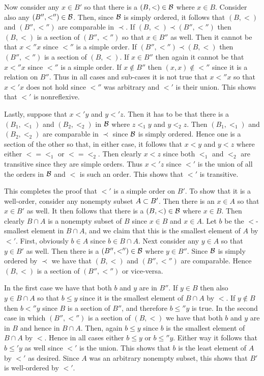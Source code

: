 {{    Now consider any $x \in B'$ so that there is a $(B,<) \in \cB$ where $x \in B$.
    Consider also any $(B'', <'') \in \cB$.
    Then, since $\cB$ is simply ordered, it follows that $(B,<)$ and $(B'', <'')$ are comparable in $\prec$.
    If $(B,<) \prec (B'',<'')$ then $(B,<)$ is a section of $(B'',<'')$ so that $x \in B''$ as well.
    Then it cannot be that $x <'' x$ since $<''$ is a simple order.
    If $(B'',<'') \prec (B,<)$ then $(B'',<'')$ is a section of $(B,<)$.
    If $x \in B''$ then again it cannot be that $x <'' x$ since $<''$ is a simple order.
    If $x \notin B''$ then $(x, x) \notin <''$ since it is a relation on $B''$.
    Thus in all cases and sub-cases it is not true that $x <'' x$ so that $x <' x$ does not hold since $<''$ was arbitrary and $<'$ is their union.
    This shows that $<'$ is nonreflexive.

    Lastly, suppose that $x <' y$ and $y <' z$.
    Then it has to be that there is a $(B_1, <_1)$ and $(B_2, <_2)$ in $\cB$ where $z <_1 y$ and  $y <_2 z$.
    Then $(B_1, <_1)$ and $(B_2, <_2)$ are comparable in $\prec$ since $\cB$ is simply ordered.
    Hence one is a section of the other so that, in either case, it follows that $x < y$ and $y < z$ where either $< = <_1$ or $< = <_2$.
    Then clearly $x < z$ since both $<_1$ and $<_2$ are transitive since they are simple orders.
    Thus $x <' z$ since $<'$ is the union of all the orders in $\cB$ and $<$ is such an order.
    This shows that $<'$ is transitive.

    This completes the proof that $<'$ is a simple order on $B'$.
    To show that it is a well-order, consider any nonempty subset $A \ss B'$.
    Then there is an $x \in A$ so that $x \in B'$ as well.
    It then follows that there is a $(B, <) \in \cB$ where $x \in B$.
    Then clearly $B \cap A$ is a nonempty subset of $B$ since $x \in B$ and $x \in A$.
    Let $b$ be the $<$-smallest element in $B \cap A$, and we claim that this is the smallest element of $A$ by $<'$.
    First, obviously $b \in A$ since $b \in B \cap A$.
    Next consider any $y \in A$ so that $y \in B'$ as well.
    Then there is a $(B'', <'') \in \cB$ where $y \in B''$.
    Since $\cB$ is simply ordered by $\prec$ we have that $(B,<)$ and $(B'',<'')$ are comparable.
    Hence $(B,<)$ is a section of $(B'',<'')$ or vice-versa.
    
    In the first case we have that both $b$ and $y$ are in $B''$.
    If $y \in B$ then also $y \in B \cap A$ so that $b \leq y$ since it is the smallest element of $B \cap A$ by $<$.
    If $y \notin B$ then $b <'' y$ since $B$ is a section of $B''$, and therefore $b \leq'' y$ is true.
    In the second case in which $(B'',<'')$ is a section of $(B,<)$ we have that both $b$ and $y$ are in $B$ and hence in $B \cap A$.
    Then, again $b \leq y$ since $b$ is the smallest element of $B \cap A$ by $<$.
    Hence in all cases either $b \leq y$ or $b \leq'' y$.
    Either way it follows that $b \leq' y$ as well since $<'$ is the union.
    This shows that $b$ is the least element of $A$ by $<'$ as desired.
    Since $A$ was an arbitrary nonempty subset, this shows that $B'$ is well-ordered by $<'$.
  }
}

